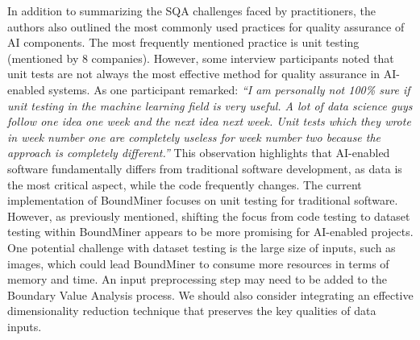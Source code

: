 \documentclass[11pt]{article}
\begin{document}
In addition to summarizing the SQA challenges faced by practitioners, the authors also outlined the most commonly used practices for quality assurance of AI components. The most frequently mentioned practice is unit testing (mentioned by 8 companies). However, some interview participants noted that unit tests are not always the most effective method for quality assurance in AI-enabled systems. As one participant remarked: \textit{“I am personally not 100\% sure if unit testing in the machine learning field is very useful. A lot of data science guys follow one idea one week and the next idea next week. Unit tests which they wrote in week number one are completely useless for week number two because the approach is completely different.”} This observation highlights that AI-enabled software fundamentally differs from traditional software development, as data is the most critical aspect, while the code frequently changes. The current implementation of BoundMiner focuses on unit testing for traditional software. However, as previously mentioned, shifting the focus from code testing to dataset testing within BoundMiner appears to be more promising for AI-enabled projects. One potential challenge with dataset testing is the large size of inputs, such as images, which could lead BoundMiner to consume more resources in terms of memory and time. An input preprocessing step may need to be added to the Boundary Value Analysis process. We should also consider integrating an effective dimensionality reduction technique that preserves the key qualities of data inputs.
\end{document}
